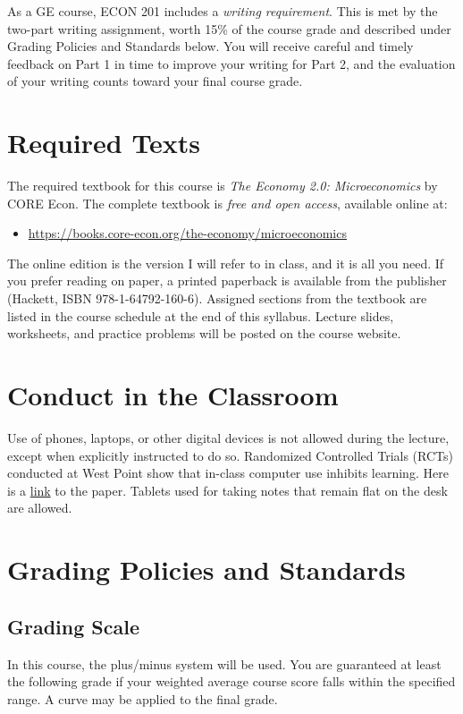 \documentclass{syllabus}
\begin{document}
\noindent As a GE course, ECON 201 includes a \textit{writing requirement}. This is met by the two-part writing assignment, worth 15\% of the course grade and described under Grading Policies and Standards below. You will receive careful and timely feedback on Part 1 in time to improve your writing for Part 2, and the evaluation of your writing counts toward your final course grade.


\section*{Required Texts}

The required textbook for this course is \textit{The Economy 2.0: Microeconomics} by CORE Econ. The complete textbook is \textit{free and open access}, available online at:
\begin{itemize}
\item[] \href{https://books.core-econ.org/the-economy/microeconomics}{https://books.core-econ.org/the-economy/microeconomics}
\end{itemize}

\noindent The online edition is the version I will refer to in class, and it is all you need. If you prefer reading on paper, a printed paperback is available from the publisher (Hackett, ISBN 978-1-64792-160-6). Assigned sections from the textbook are listed in the course schedule at the end of this syllabus. Lecture slides, worksheets, and practice problems will be posted on the course website.

\section*{Conduct in the Classroom}
Use of phones, laptops, or other digital devices is not allowed during the lecture, except when explicitly instructed to do so. Randomized Controlled Trials (RCTs) conducted at West Point show that in-class computer use inhibits learning. Here is a \href{https://oema.army.mil/pub/2017_Carter_Greenberg_Walker_Computer_Usage_RCT_USMA.pdf}{link} to the paper. Tablets used for taking notes that remain flat on the desk are allowed.

\section*{Grading Policies and Standards}

\subsection*{Grading Scale}
In this course, the plus/minus system will be used. You are guaranteed at least the following grade if your weighted average course score falls within the specified range. A curve may be applied to the final grade.
\end{document}
